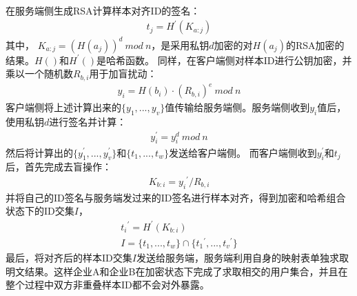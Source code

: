 \documentclass[letterpaper,10pt,english]{sphinxmanual}
\begin{document}
\sphinxAtStartPar
在服务端侧生成RSA计算样本对齐ID的签名：
\begin{equation}\label{equation:chapter_federated_learning/vertical_fl:chapter_federated_learning/vertical_fl:0}
\begin{split}t_j=H^{'}(K_{a:j})\end{split}
\end{equation}
\sphinxAtStartPar
其中，
\(K_{a:j}=(H(a_j))^d \ mod \ n\)，是采用私钥\(d\)加密的对\(H(a_j)\)的RSA加密的结果。\(H()\)和\(H^{'}()\)是哈希函数。
同样，在客户端侧对样本ID进行公钥加密，并乘以一个随机数\(R_{b,i}\)用于加盲扰动：
\begin{equation}\label{equation:chapter_federated_learning/vertical_fl:chapter_federated_learning/vertical_fl:1}
\begin{split}y_i=H(b_i)\cdot(R_{b,i})^e \ mod \ n\end{split}
\end{equation}
\sphinxAtStartPar
客户端侧将上述计算出来的\(\{y_1,...,y_v\}\)值传输给服务端侧。服务端侧收到\(y_i\)值后，使用私钥\(d\)进行签名并计算：
\begin{equation}\label{equation:chapter_federated_learning/vertical_fl:chapter_federated_learning/vertical_fl:2}
\begin{split}y_i^{'}=y_i^d \ mod \ n\end{split}
\end{equation}
\sphinxAtStartPar
然后将计算出的\(\{y_1^{'},...,y_v^{'}\}\)和\(\{t_1,...,t_w\}\)发送给客户端侧。
而客户端侧收到\(y_i^{'}\)和\(t_j\)后，首先完成去盲操作：
\begin{equation}\label{equation:chapter_federated_learning/vertical_fl:chapter_federated_learning/vertical_fl:3}
\begin{split}K_{b:i}={y_i}^{'}/R_{b,i}\end{split}
\end{equation}
\sphinxAtStartPar
并将自己的ID签名与服务端发过来的ID签名进行样本对齐，得到加密和哈希组合状态下的ID交集\(I\)，
\begin{equation}\label{equation:chapter_federated_learning/vertical_fl:chapter_federated_learning/vertical_fl:4}
\begin{split}{t_i}^{'}=H^{'}(K_{b:i}) \\I=\{t_1,...,t_w\}\cap \{{t_1}^{'},...,{t_v}^{'}\}\end{split}
\end{equation}
\sphinxAtStartPar
最后，将对齐后的样本ID交集\(I\)发送给服务端，服务端利用自身的映射表单独求取明文结果。这样企业A和企业B在加密状态下完成了求取相交的用户集合，并且在整个过程中双方非重叠样本ID都不会对外暴露。
\end{document}
